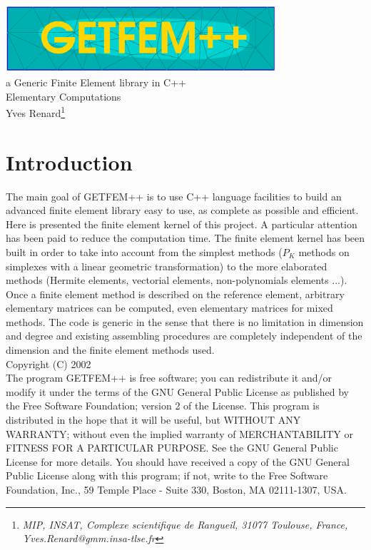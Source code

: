 \documentclass[11pt,a4paper]{article}
\begin{document}
\begin{center}
  \includegraphics[width=10cm,angle=0]{getfem_logo.eps}\\[0.2cm]
  a Generic Finite Element library in C++ \\[0.5cm]
  {\Huge \sc Elementary Computations} \\[0.5cm]
  { \large Yves \sc Renard\footnote{ \it MIP, INSAT, Complexe scientifique de Rangueil, 31077 Toulouse, France, Yves.Renard@gmm.insa-tlse.fr } } \\[1.0cm]
\end{center}




\section*{Introduction}
The main goal of GETFEM++ is to use C++ language facilities to build an advanced finite element library easy to use, as complete as possible and efficient. Here is presented the finite element kernel of this project. A particular attention has been paid to reduce the computation time. The finite element kernel has been built in order to take into account from the simplest methods ($P_K$ methods on simplexes with a linear geometric transformation) to the more elaborated methods (Hermite elements, vectorial elements, non-polynomials elements ...). Once a finite element method is described on the reference element, arbitrary elementary  matrices can be computed, even elementary matrices for mixed methods. The code is generic in the sense that there is no limitation in dimension and degree and existing assembling procedures are completely independent of the dimension and the finite element methods used.\\[5cm]
Copyright (C) 2002\\
The program GETFEM++ is free software; you can redistribute it and/or modify
it under the terms of the GNU General Public License as published by
the Free Software Foundation; version 2 of the License.
This program is distributed in the hope that it will be useful,
but WITHOUT ANY WARRANTY; without even the implied warranty of
MERCHANTABILITY or FITNESS FOR A PARTICULAR PURPOSE.  See the
GNU General Public License for more details.
You should have received a copy of the GNU General Public License
along with this program; if not, write to the Free Software Foundation,
Inc., 59 Temple Place - Suite 330, Boston, MA  02111-1307, USA.
\end{document}

